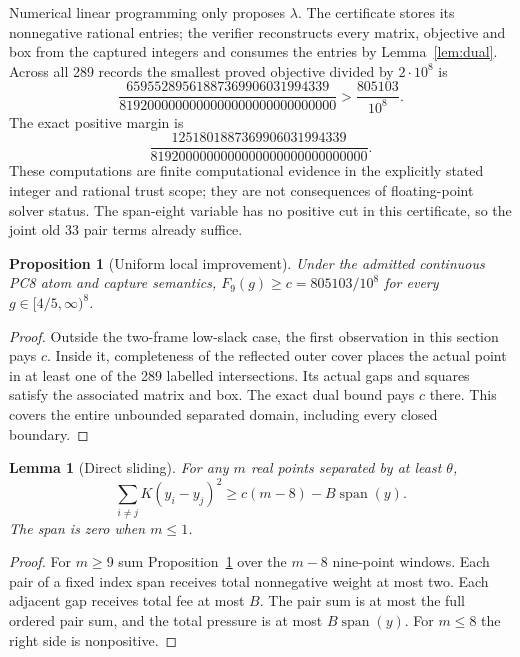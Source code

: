 \documentclass[11pt,a4paper]{article}
\newtheorem{lemma}[theorem]{Lemma}
\newtheorem{proposition}[theorem]{Proposition}
\theoremstyle{remark}
\begin{document}
Numerical linear programming only proposes $\lambda$. The certificate
stores its nonnegative rational entries; the verifier reconstructs every
matrix, objective and box from the captured integers and consumes the
entries by Lemma~\ref{lem:dual}. Across all 289 records the smallest
proved objective divided by $2\cdot10^8$ is
\[
 \frac{65955289561887369906031994339}
 {8192000000000000000000000000000}>\frac{805103}{10^8}.
\]
The exact positive margin is
\[
 \frac{1251801887369906031994339}
 {8192000000000000000000000000000}.
\]
These computations are finite computational evidence in the explicitly
stated integer and rational trust scope; they are not consequences of
floating-point solver status. The span-eight variable has no positive
cut in this certificate, so the joint old 33 pair terms already suffice.

\begin{proposition}[Uniform local improvement]\label{prop:nine}
Under the admitted continuous PC8 atom and capture semantics,
$F_9(g)\ge c=805103/10^8$ for every $g\in[4/5,\infty)^8$.
\end{proposition}
\begin{proof}
Outside the two-frame low-slack case, the first observation in this
section pays $c$. Inside it, completeness of the reflected outer cover
places the actual point in at least one of the 289 labelled
intersections. Its actual gaps and squares satisfy the associated
matrix and box. The exact dual bound pays $c$ there. This covers the
entire unbounded separated domain, including every closed boundary.
\end{proof}

\begin{lemma}[Direct sliding]\label{lem:sliding}
For any $m$ real points separated by at least $\theta$,
\begin{equation}\label{eq:sliding}
 \sum_{i\ne j}K(y_i-y_j)^2
 \ge c(m-8)-B\operatorname{span}(y).
\end{equation}
The span is zero when $m\le1$.
\end{lemma}
\begin{proof}
For $m\ge9$ sum Proposition~\ref{prop:nine} over the $m-8$
nine-point windows. Each pair of a fixed index span receives total
nonnegative weight at most two. Each adjacent gap receives total
fee at most $B$. The pair sum is at most the full ordered pair
sum, and the total pressure is at most $B\operatorname{span}(y)$.
For $m\le8$ the right side is nonpositive.
\end{proof}
\end{document}
